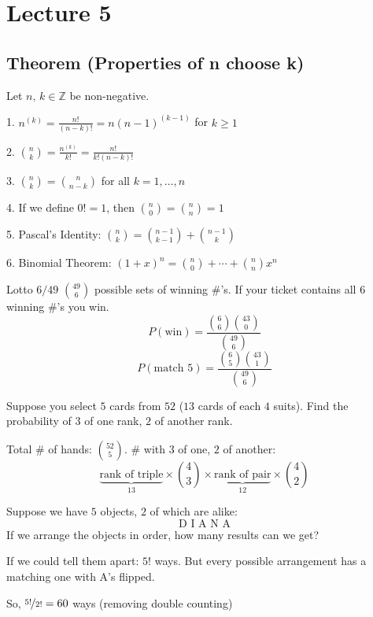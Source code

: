 \section{Lecture 5}
\begin{thmbox}
    \subsection{Theorem (Properties of n choose k)}
    Let $ n,\,k\in \mathbb{Z} $ be non-negative.
    
    1. $ n^{(k)}=\frac{n!}{(n-k)!}=n(n-1)^{(k-1)} $ for $ k\ge 1 $

    2. $ \binom{n}{k}=\frac{n^{(k)}}{k!}=\frac{n!}{k!(n-k)!} $

    3. $\binom{n}{k}=\binom{n}{n-k}$ for all $ k=1,\ldots,n $

    4. If we define $ 0!=1 $, then $\binom{n}{0}=\binom{n}{n}=1$

    5. Pascal's Identity: $\binom{n}{k}=\binom{n-1}{k-1}+\binom{n-1}{k}$

    6. Binomial Theorem: $ (1+x)^n=\binom{n}{0}+\cdots +\binom{n}{n}x^n $
\end{thmbox}


Lotto $ 6/49 $ $ \binom{49}{6} $ possible sets of winning \#'s. If your
ticket contains all $ 6 $ winning \#'s you win.
\[ P(\text{win})=\frac{\binom{6}{6}\binom{43}{0}}{\binom{49}{6}} \]
\[ P(\text{match }5)=\frac{\binom{6}{5}\binom{43}{1}}{\binom{49}{6}} \]


Suppose you select $ 5 $ cards from $ 52 $ ($ 13 $ cards of each $ 4 $ suits).
Find the probability of $ 3 $ of one rank, $ 2 $ of another rank.

Total \# of hands: $ \binom{52}{5} $.
\# with $ 3 $ of one, $2$ of another:
\[ \underbrace{\text{rank of triple}}_{13}\times \binom{4}{3}\times
\underbrace{\text{rank of pair}}_{12}\times \binom{4}{2} \]


Suppose we have $ 5 $ objects, $ 2 $ of which are alike:
\[ \text{D I A N A} \]
If we arrange the objects in order, how many results can we get?

If we could tell them apart: $ 5! $ ways. But every possible arrangement
has a matching one with A's flipped.

So, $ \nicefrac{5!}{2!} =60 $ ways (removing double counting)

